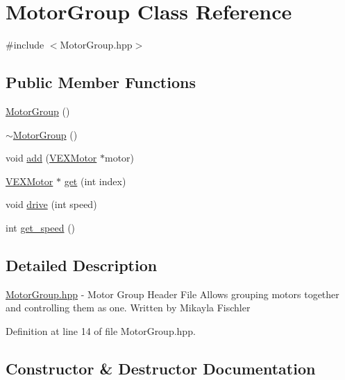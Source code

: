\hypertarget{class_motor_group}{}\section{Motor\+Group Class Reference}
\label{class_motor_group}


{\ttfamily \#include $<$Motor\+Group.\+hpp$>$}

\subsection*{Public Member Functions}
\begin{DoxyCompactItemize}
\item 
\hyperlink{class_motor_group_abb8e3e077cdc061d321162f846647aeb}{Motor\+Group} ()
\item 
\hyperlink{class_motor_group_aff77909a09cada0bf7742de4c91ba630}{$\sim$\+Motor\+Group} ()
\item 
void \hyperlink{class_motor_group_addfa8105bc2fe799db770b7777a7ee4f}{add} (\hyperlink{class_v_e_x_motor}{V\+E\+X\+Motor} $\ast$motor)
\item 
\hyperlink{class_v_e_x_motor}{V\+E\+X\+Motor} $\ast$ \hyperlink{class_motor_group_a5bb7e87231ada3770df40783a2c6afda}{get} (int index)
\item 
void \hyperlink{class_motor_group_a0c2302784f8226542ded59b6812720ac}{drive} (int speed)
\item 
int \hyperlink{class_motor_group_a3f1a21bc3192613adecf364c839b2fed}{get\+\_\+speed} ()
\end{DoxyCompactItemize}


\subsection{Detailed Description}
\hyperlink{_motor_group_8hpp}{Motor\+Group.\+hpp} -\/ Motor Group Header File Allows grouping motors together and controlling them as one. Written by Mikayla Fischler 

Definition at line 14 of file Motor\+Group.\+hpp.



\subsection{Constructor \& Destructor Documentation}
\mbox{\label{class_motor_group_abb8e3e077cdc061d321162f846647aeb}} 
